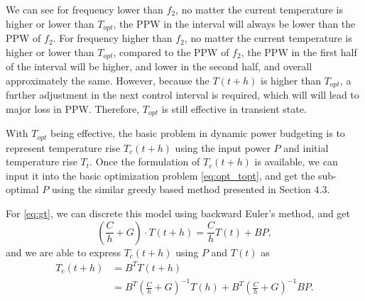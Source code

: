 We can see for frequency lower than $f_{2}$, no matter the current temperature is higher or lower than $T_{opt}$, the PPW in the interval will always be lower than the PPW of $f_{2}$. For frequency higher than $f_{2}$, no matter the current temperature is higher or lower than $T_{opt}$, compared to the PPW of $f_{2}$, the PPW in the first half of the interval will be higher, and lower in the second half, and overall approximately the same. However, because the $T(t+h)$ is higher than $T_{opt}$, a further adjustment in the next control interval is required, which will will lead to major loss in PPW. Therefore, $T_{opt}$ is still effective in transient state.

With $T_{opt}$ being effective, the basic problem in dynamic power budgeting is to represent temperature rise $T_{c}(t+h)$ using the input power $P$ and initial temperature rise $T_{t}$. Once the formulation of $T_{c}(t+h)$ is available, we can input it into the basic optimization problem \eqref{eq:opt_topt}, and get the sub-optimal $P$ using the similar greedy based method presented in Section $4.3$.

For \eqref{eq:gt}, we can discrete this model using backward Euler's method, and get
\begin{equation}\label{eq:discrete_gt}
(\frac{C}{h}+G)\cdot T(t+h)=\frac{C}{h}T(t)+BP,
\end{equation}
and we are able to express $T_{c}(t+h)$ using $P$ and $T(t)$ as
\begin{equation}\label{eq:discrete_gt}
  \begin{split}
T_{c}(t+h)&=B^{T}T(t+h)\\
&=B^{T}(\frac{C}{h}+G)^{-1}T(h)+B^{T}(\frac{C}{h}+G)^{-1}BP.
  \end{split}
\end{equation}


